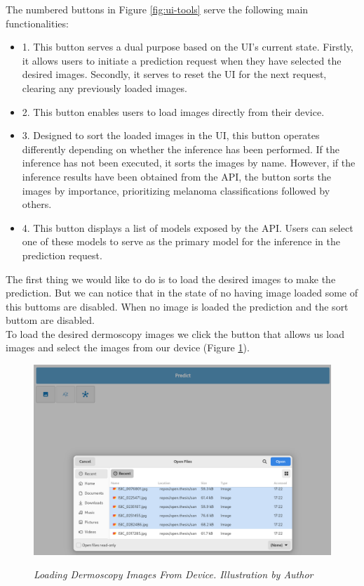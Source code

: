 The numbered buttons in Figure \ref{fig:ui-tools} serve the following
main functionalities:

\begin{itemize}
  \item 1. This button serves a dual purpose based on the UI's current state. Firstly, it allows users to initiate a prediction request when they have selected the desired images. Secondly, it serves to reset the UI for the next request, clearing any previously loaded images.
  \item 2. This button enables users to load images directly from their device.
  \item 3. Designed to sort the loaded images in the UI, this button operates differently depending on whether the inference has been performed. If the inference has not been executed, it sorts the images by name. However, if the inference results have been obtained from the API, the button sorts the images by importance, prioritizing melanoma classifications followed by others.
  \item 4. This button displays a list of models exposed by the API. Users can select one of these models to serve as the primary model for the inference in the prediction request.
\end{itemize}


The first thing we would like to do is to load the desired images to make the
prediction. But we can notice that in the state of no having image loaded some
of this buttoms are disabled. When no image is loaded the prediction and the
sort buttom are disabled. \\

To load the desired dermoscopy images we click the button that allows us load
images and select the images from our device
(Figure \ref{fig:selecting-imgs}).

\begin{figure}[H]
  \centering
  \includegraphics[width=\textwidth]{imatges/results/selecting-images.png}
  \caption[Loading Dermoscopy Images From Device]{\textit{Loading Dermoscopy Images From Device. Illustration by Author}}
  {\label{fig:selecting-imgs}}
\end{figure}

